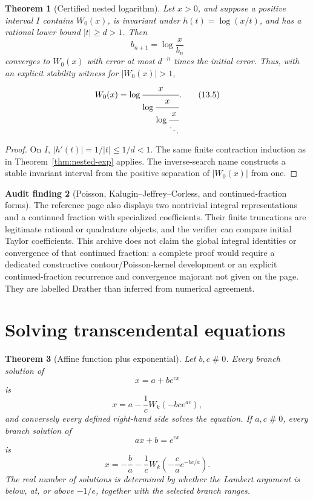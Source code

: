 \documentclass[11pt]{article}
\newtheorem{theorem}{Theorem}[section]
\theoremstyle{definition}
\newtheorem{audit}[theorem]{Audit finding}
\newcommand{\abs}[1]{\left|#1\right|}
\newcommand{\apart}{\mathrel{\#}}
\newcommand{\StatusD}{\textsf{D}}
\begin{document}
\begin{theorem}[Certified nested logarithm]\label{thm:nested-log}
Let \(x>0\), and suppose a positive interval \(I\) contains \(W_0(x)\), is
invariant under \(h(t)=\log(x/t)\), and has a rational lower bound
\(\abs t\ge d>1\).  Then
\[
 b_{n+1}=\log\frac{x}{b_n}
\]
converges to \(W_0(x)\) with error at most \(d^{-n}\) times the initial error.
Thus, with an explicit stability witness for \(\abs{W_0(x)}>1\),
\[
 W_0(x)=\log\cfrac{x}{\log\cfrac{x}{\log\cfrac{x}{\ddots}}}.
 \tag{13.5}
\]
\end{theorem}

\begin{proof}
On \(I\), \(\abs{h'(t)}=1/\abs t\le1/d<1\).  The same finite contraction
induction as in Theorem~\ref{thm:nested-exp} applies.  The inverse-search name
constructs a stable invariant interval from the positive separation of
\(\abs{W_0(x)}\) from one.
\end{proof}

\begin{audit}[Poisson, Kalugin--Jeffrey--Corless, and continued-fraction forms]
The reference page also displays two nontrivial integral representations and a
continued fraction with specialized coefficients.  Their finite truncations
are legitimate rational or quadrature objects, and the verifier can compare
initial Taylor coefficients.  This archive does not claim the global integral
identities or convergence of that continued fraction: a complete proof would
require a dedicated constructive contour/Poisson-kernel development or an
explicit continued-fraction recurrence and convergence majorant not given on
the page.  They are labelled \StatusD rather than inferred from numerical
agreement.
\end{audit}

\section{Solving transcendental equations}\label{sec:equations}

\begin{theorem}[Affine function plus exponential]\label{thm:affine-exp}
Let \(b,c\apart0\).  Every branch solution of
\[
 x=a+b e^{cx}
\]
is
\[
 x=a-\frac1c W_k(-bc e^{ac}),
 \tag{14.1}
\]
and conversely every defined right-hand side solves the equation.  If
\(a,c\apart0\), every branch solution of
\[
 ax+b=e^{cx}
\]
is
\[
 x=-\frac ba-\frac1c
 W_k\!\left(-\frac ca e^{-bc/a}\right).
 \tag{14.2}
\]
The real number of solutions is determined by whether the Lambert argument is
below, at, or above \(-1/e\), together with the selected branch ranges.
\end{theorem}
\end{document}
